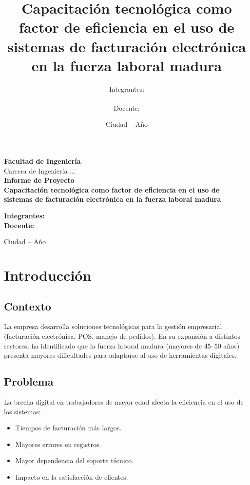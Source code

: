 \documentclass[12pt,a4paper]{report}
\title{Capacitación tecnológica como factor de eficiencia en el uso de sistemas de facturación electrónica en la fuerza laboral madura}
\author{Integrantes: \\
\\
Docente: }
\date{Ciudad -- Año}
\begin{document}
\begin{titlepage}
    \centering
    {\Large \textbf{Facultad de Ingeniería}}\\[0.5cm]
    {\large Carrera de Ingeniería ...}\\[3cm]
    {\LARGE \textbf{Informe de Proyecto}}\\[0.5cm]
    {\Large \textbf{Capacitación tecnológica como factor de eficiencia en el uso de sistemas de facturación electrónica en la fuerza laboral madura}}\\[3cm]
    \begin{flushleft}
        \textbf{Integrantes:} \\
        \vspace{1cm}
        \textbf{Docente:} \\
    \end{flushleft}
    \vfill
    {\large Ciudad -- Año}
\end{titlepage}

\tableofcontents
\newpage

\chapter{Introducción}

\section*{Contexto}
La empresa desarrolla soluciones tecnológicas para la gestión empresarial (facturación electrónica, POS, manejo de pedidos). En su expansión a distintos sectores, ha identificado que la fuerza laboral madura (mayores de 45--50 años) presenta mayores dificultades para adaptarse al uso de herramientas digitales.

\section*{Problema}
La brecha digital en trabajadores de mayor edad afecta la eficiencia en el uso de los sistemas:
\begin{itemize}
    \item Tiempos de facturación más largos.
    \item Mayores errores en registros.
    \item Mayor dependencia del soporte técnico.
    \item Impacto en la satisfacción de clientes.
\end{itemize}
\end{document}
